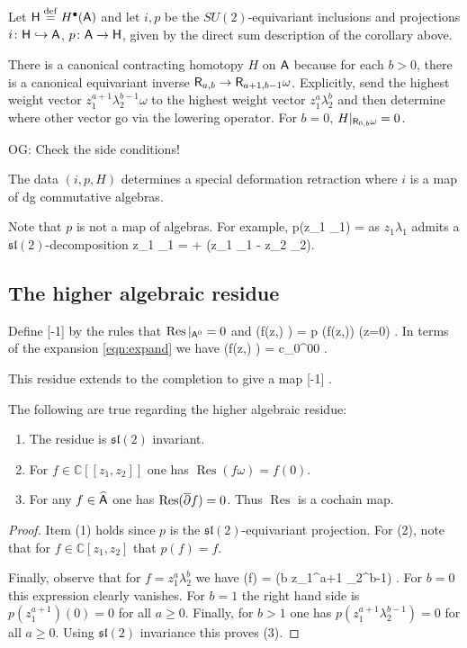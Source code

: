 \documentclass[11pt]{amsart}
\def\C{{\mathbb{C}}}
\newcommand{\laurent}{\Hat \sfA}
\renewcommand{\op}{\operatorname}
\def\lie#1{\ensuremath{\mathfrak{#1}}}
\def\owen#1{{\textcolor{violet!65!black}{OG: {#1}}}}
\begin{document}
Let $\mathsf H \overset{\rm def}{=} H^\bullet(\mathsf A)$ and let $i,p$ be the $SU(2)$-equivariant inclusions and projections $i \colon \mathsf H \hookrightarrow \mathsf A$, $p \colon \mathsf A \to \mathsf H$, given by the direct sum description of the corollary above.

There is a canonical contracting homotopy $H$ on $\mathsf A$ 
because for each $b > 0$, there is a canonical equivariant inverse $\mathsf R_{a,b} \to \mathsf R_{a+1,b-1} \omega$.
Explicitly, send the highest weight vector $z_1^{a+1} \lambda_2^{b-1} \omega$ to the highest weight vector $z_1^{a} \lambda_2^{b}$ and then determine where other vector go via the lowering operator.
For $b = 0$, $H|_{\mathsf R_{0,b}\omega} = 0$.

\owen{Check the side conditions!}

\begin{lem}
The data $(i,p,H)$ determines a special deformation retraction where $i$ is a map of dg commutative algebras.
\end{lem}

Note that $p$ is not a map of algebras. 
For example,
\beqn
p(z_1 \lambda_1) = 
\eeqn
as $z_1 \lambda_1$ admits a $\lie{sl}(2)$-decomposition
\beqn
z_1 \lambda_1 =    +  (z_1 \lambda_1 - z_2 \lambda_2).
\eeqn
\subsection{The higher algebraic residue}

Define
\beqn
\op{Res} \colon \sfA \to \C[-1]
\eeqn
by the rules that $\op{Res}|_{\sfA^0} = 0$ and
\beqn
\op{Res} \left(f(z,\lambda) \omega \right) = p (f(z,\lambda)) (z=0) .
\eeqn
In terms of the expansion \eqref{eqn:expand} we have
\beqn
\op{Res} \left(f(z,\lambda) \omega \right) = c_{0}^{00} .
\eeqn


This residue extends to the completion to give a map
\beqn
\op{Res} \colon \laurent \to \C[-1] .
\eeqn

\begin{lem}
\label{lem:res} 
The following are true regarding the higher algebraic residue:
\begin{enumerate}
\item The residue is $\lie{sl}(2)$ invariant.
\item For $f \in \C[[z_1,z_2]]$ one has $\op{Res}(f \omega) = f(0)$.
\item For any $f \in \laurent$ one has $\op{Res}(\dbar f) = 0$.
Thus $\op{Res}$ is a cochain map.
\end{enumerate}
\end{lem}
\begin{proof}
Item (1) holds since $p$ is the $\lie{sl}(2)$-equivariant projection. 
For (2), note that for $f \in \C[z_1,z_2]$ that $p(f) = f$.

Finally, observe that for $f = z_1^a \lambda_2^b$ we have
\beqn
\op{Res}(\dbar f) = \op{Res}(b z_1^{a+1} \lambda_2^{b-1}) .
\eeqn
For $b =0$ this expression clearly vanishes. 
For $b = 1$ the right hand side is $p( z_1^{a+1})(0) = 0$ for all $a \geq 0$.
Finally, for $b > 1$ one has $p(z_1^{a+1} \lambda_2^{b-1}) = 0$ for all $a \geq 0$.
Using $\lie{sl}(2)$ invariance this proves (3).
\end{proof}
\end{document}
